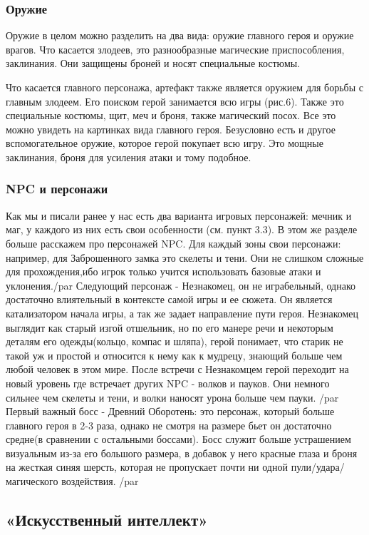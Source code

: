 \documentclass{article}
\begin{document}
\subsubsection{Оружие}
\par Оружие в целом можно разделить на два вида: оружие главного героя и оружие врагов. Что касается злодеев, это разнообразные магические приспособления, заклинания. Они защищены броней и носят специальные костюмы. 
\par Что касается главного персонажа, артефакт также является оружием для борьбы с главным злодеем. Его поиском герой занимается всю игры (рис.6). Также это специальные костюмы, щит, меч и броня, также магический посох. Все это можно увидеть на картинках вида главного героя. 
Безусловно есть и другое вспомогательное оружие, которое герой покупает всю игру. Это мощные заклинания, броня для усиления атаки и тому подобное.
\subsubsection{NPC и персонажи}
Как мы и писали ранее у нас есть два варианта игровых персонажей: мечник и маг, у каждого из них есть свои особенности (см. пункт 3.3). В этом же разделе больше расскажем про персонажей NPC. Для каждый зоны свои персонажи: например, для Заброшенного замка это скелеты и тени. Они не слишком сложные для прохождения,ибо игрок только учится использовать  базовые атаки и уклонения./par
Следующий персонаж - Незнакомец, он не играбельный, однако достаточно влиятельный в контексте самой игры и ее сюжета. Он является катализатором начала игры, а так же задает направление пути героя. Незнакомец выглядит как старый изгой отшельник, но по его манере речи и некоторым деталям его одежды(кольцо, компас и шляпа), герой понимает, что старик не такой уж и простой и относится к нему как  к мудрецу, знающий больше чем любой человек в этом мире. После встречи с Незнакомцем герой переходит на новый уровень где встречает других NPC -  волков и пауков. Они немного сильнее чем скелеты и тени, и волки наносят урона больше чем пауки. /par
Первый важный босс - Древний Оборотень: это персонаж, который больше главного героя в 2-3 раза, однако не смотря на размере бьет он достаточно средне(в сравнении с остальными боссами). Босс служит больше устрашением визуальным из-за его большого размера, в добавок у него красные глаза и броня на жесткая синяя шерсть, которая не пропускает почти ни одной пули/удара/магического воздействия. /par

\subsection{«Искусственный интеллект»}
\end{document}
